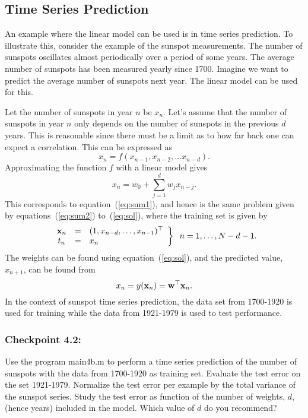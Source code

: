 \documentclass[times,12pt]{article}    %
\def\x{{\bf x}}
\def\w{{\bf w}}
\begin{document}
\subsection*{Time Series Prediction}
An example where the linear model can be used is in time series
prediction. To illustrate this, consider the example of the sunspot
measurements. The number of sunspots oscillates almost periodically
over a period of some years. The average number of sunspots has been
measured yearly since 1700. Imagine we want to predict the average
number of sunspots next year. The linear model can be used for this.

Let the number of sunspots in year $n$ be $x_n$.  Let's assume that
the number of sunspots in year $n$ only depends on the number of
sunspots in the previous $d$ years. This is reasonable since there
must be a limit as to how far back one can expect a correlation. This
can be expressed as
\begin{equation}
  \label{eq:iterf}
  x_n = f(x_{n-1}, x_{n-2}, \ldots x_{n-d}).
\end{equation}
Approximating the function $f$ with a linear model gives
\begin{equation}
  \label{eq:sun1}
  x_n = w_0 + \sum_{j=1}^d w_j x_{n-j}.
\end{equation}
This corresponds to equation~(\ref{eq:sum1}), and hence is the same
problem given by equations~(\ref{eq:sum2}) to~(\ref{eq:sol}), where
the training set is given by
\begin{equation}
  \label{eq:train}
  \left.
  \begin{array}{ccl}
    \x_n &=& (1, x_{n-d}, \ldots , x_{n-1})^\top\\
    t_n &=& x_n
  \end{array} \right\} \;\; n = 1,\ldots,N-d-1.
\end{equation}
The weights can be found using equation~(\ref{eq:sol}), and the
predicted value, $x_{n+1}$, can be found from
\begin{equation}
  \label{eq:pred}
  x_{n} = y(\x_n) = \w^\top\x_n.
\end{equation}
In the context of sunspot time series prediction, the data set from 1700-1920 is
used for training while the data from 1921-1979 is used to test performance.

\subsubsection*{Checkpoint 4.2:}
Use the program {\sf main4b.m} to perform a time series prediction of
the number of sunspots with the data from 1700-1920 as training set.
Evaluate the test error on the set 1921-1979. Normalize the test error
per example by the total variance of the sunspot series.
Study the test error as function of the number of weights, $d$, (hence
years) included in the model. Which value of $d$ do you recommend?
\end{document}
